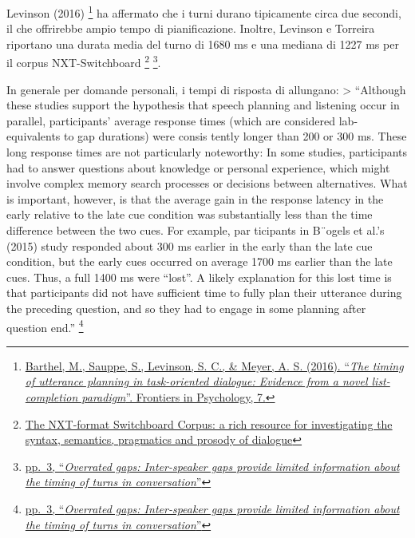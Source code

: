 \documentclass[
]{article}
\begin{document}
Levinson (2016) \footnote{\href{https://doi.org/10.3389/fpsyg.2016.01858}{Barthel, M., Sauppe, S., Levinson, S. C., \& Meyer, A. S. (2016). ``\emph{The timing of utterance planning in task-oriented dialogue: Evidence from a novel list-completion paradigm}''. Frontiers in Psychology, 7.}} ha affermato che i turni durano tipicamente circa due secondi, il che offrirebbe ampio tempo di pianificazione. Inoltre, Levinson e Torreira riportano una durata media del turno di 1680 ms e una mediana di 1227 ms per il corpus NXT-Switchboard \footnote{\href{DOC/The_NXT_format_Switchboard_Corpus_a_rich_resource_for_investigating_the_syntax_semantics_pragmatics_and_prosody_of_dialogue.pdf}{The NXT-format Switchboard Corpus: a rich resource for investigating the syntax, semantics, pragmatics and prosody of dialogue}} \footnote{\href{DOC/1-s2.0-S0010027722000257-main.pdf}{pp.~3, ``\emph{Overrated gaps: Inter-speaker gaps provide limited information about the timing of turns in conversation}''}}.

In generale per domande personali, i tempi di risposta di allungano: \textgreater{} ``Although these studies support the hypothesis that speech planning and listening occur in parallel, participants' average response times (which are considered lab-equivalents to gap durations) were consis­ tently longer than 200 or 300 ms. These long response times are not particularly noteworthy: In some studies, participants had to answer questions about knowledge or personal experience, which might involve complex memory search processes or decisions between alternatives. What is important, however, is that the average gain in the response latency in the early relative to the late cue condition was substantially less than the time difference between the two cues. For example, par­ ticipants in B¨ogels et al.'s (2015) study responded about 300 ms earlier in the early than the late cue condition, but the early cues occurred on average 1700 ms earlier than the late cues. Thus, a full 1400 ms were ``lost''. A likely explanation for this lost time is that participants did not have sufficient time to fully plan their utterance during the preceding question, and so they had to engage in some planning after question end.'' \footnote{\href{DOC/1-s2.0-S0010027722000257-main.pdf}{pp.~3, ``\emph{Overrated gaps: Inter-speaker gaps provide limited information about the timing of turns in conversation}''}}
\end{document}
